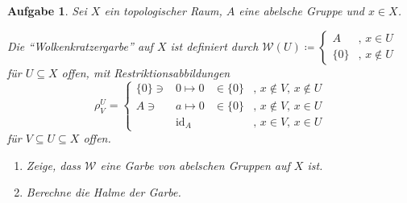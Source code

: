 \documentclass[paper = A4, fontsize=12pt, numbers=noendperiod, chapterprefix=true]{scrbook}
\theoremstyle{break}
\newtheorem{Aufg}{Aufgabe}
\theoremstyle{nonumberbreak}
\theoremstyle{nonumberplain}
\DeclareMathOperator{\id}{id}
\begin{document}
\begin{Aufg}
 Sei $X$ ein topologischer Raum, $A$ eine abelsche Gruppe und $x \in X$. 

Die "`Wolkenkratzergarbe"' auf $X$ ist definiert durch 
$\mathcal{W}(U) \coloneqq \left\{ \begin{array}{ll}
                                   A & ,\, x \in U\\
                                   \{0\} & ,\,x \notin U
                                  \end{array}
\right.$ f\"ur $U \subseteq X$ offen, mit Restriktionsabbildungen 
$$\rho_V^U = \left\{ \begin{array}{rcll}
                     \{0\} \ni &0 \mapsto 0& \in \{0\}& ,\, x \notin V,\, x \notin U\\
                     A \ni &a \mapsto 0& \in \{0\}& ,\, x \notin V,\, x \in U\\
                     & \id_A && ,\,x \in V,\, x \in U
                    \end{array} \right.$$ f\"ur $V \subseteq U \subseteq X$ offen.
\begin{enumerate}%
 \item Zeige, dass $\mathcal{W}$ eine Garbe von abelschen Gruppen auf $X$ ist.
 \item Berechne die Halme der Garbe.
\end{enumerate}
\end{Aufg}
\end{document}

